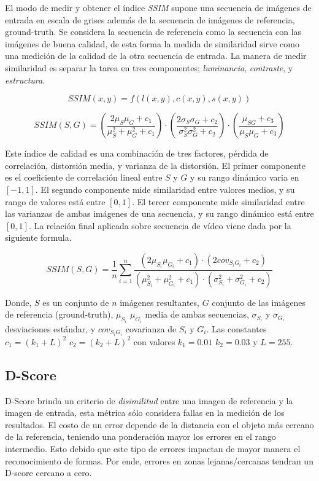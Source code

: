 El modo de medir y obtener el índice \emph{SSIM} supone una secuencia de imágenes de entrada en escala de grises además de la secuencia de imágenes de referencia, ground-truth. Se considera la secuencia de referencia como la secuencia con las imágenes de buena calidad, de esta forma la medida de similaridad sirve como una medición de la calidad de la otra secuencia de entrada. La manera de medir similaridad es separar la tarea en tres componentes; \emph{luminancia}, \emph{contraste}, y \emph{estructura}.

\begin{equation}
SSIM(x,y) = f(l(x,y), c(x,y),s(x,y)) 
\end{equation}

\begin{equation}
SSIM(S,G) = (\frac{2\mu_S\mu_G + c_1}{\mu_S^2 + \mu_G^2 + c_1}) \cdot (\frac{2\sigma_S\sigma_G + c_2}{\sigma_S^2\sigma_G^2 + c_2}) \cdot (\frac{\mu_{SG} + c_3}{\mu_S\mu_G + c_3})
\end{equation}

Este índice de calidad es una combinación de tres factores, pérdida de correlación, distorsión media, y varianza de la distorsión. El primer componente es el coeficiente de correlación lineal entre $S$ y $G$ y su rango dinámico varia en $[-1,1]$. El segundo componente mide similaridad entre valores medios, y su rango de valores está entre $[0,1]$. El tercer componente mide similaridad entre las varianzas de ambas imágenes de una secuencia, y su rango dinámico está entre $[0,1]$. La relación final aplicada sobre secuencia de vídeo viene dada por la siguiente formula. 


\begin{equation}
SSIM(S,G) = \frac{1}{n} \sum_{i=1}^{n} \frac{(2\mu_{S_{i}} \mu_{G_{i}} + c_1) \cdot (2 cov_{S_iG_i} + c_2)}  {(\mu^2_{S_i} + \mu^2_{G_i} + c_1) \cdot (\sigma^2_{S_i} + \sigma^2_{G_i} + c_2)}
\end{equation}

Donde, $S$ es un conjunto de $n$ imágenes resultantes, $G$ conjunto de las imágenes de referencia (ground-truth), $\mu_{S_i}$ $\mu_{G_i}$ media de ambas secuencias, $\sigma_{S_i}$ y $\sigma_{G_i}$ desviaciones estándar, y $cov_{S_iG_i}$ covarianza de $S_i$ y $G_i$. Las constantes $c_1 = (k_1 + L)^2$ $c_2=(k_2 + L)^2$ con valores $k_1=0.01$ $k_2=0.03$ y $L=255$.


\subsection{D-Score}
D-Score brinda un criterio de \emph{disimilitud} entre una imagen de referencia y la imagen de entrada, esta métrica sólo considera fallas en la medición de los resultados. El costo de un error depende de la distancia con el objeto más cercano de la referencia, teniendo una ponderación mayor los errores en el rango intermedio. Esto debido que este tipo de errores impactan de mayor manera el reconocimiento de formas. Por ende, errores en zonas lejanas/cercanas tendran un D-score cercano a cero. 

